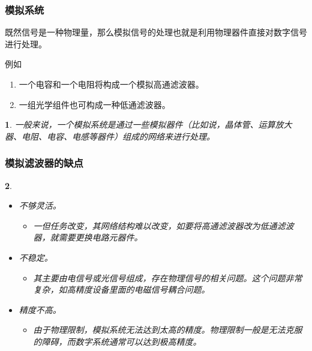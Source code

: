 \documentclass[notheorems,compress,mathserif,table]{beamer}
\newtheorem{dablock}{}
\begin{document}
\begin{frame}\frametitle{模拟系统}%


    既然信号是一种物理量，那么模拟信号的处理也就是利用物理器件直接对数字信号进行处理。

例如
\begin{enumerate}
    \item 一个电容和一个电阻将构成一个模拟高通滤波器。
    \item 一组光学组件也可构成一种低通滤波器。
\end{enumerate}
\begin{dablock}
    一般来说，一个模拟系统是通过一些模拟器件（比如说，晶体管、运算放大器、电阻、电容、电感等器件）组成的网络来进行处理。
\end{dablock}
\end{frame}
%
%
%
%
%
%
\begin{frame}\frametitle{模拟滤波器的缺点}%

\begin{dablock}
    \begin{itemize}
      \item [(1)] 不够灵活。
            \begin{itemize}
              \item 一但任务改变，其网络结构难以改变，如要将高通滤波器改为低通滤波器，就需要更换电路元器件。
            \end{itemize}
      \item [(2)]  不稳定。
            \begin{itemize}
              \item 其主要由电信号或光信号组成，存在物理信号的相关问题。这个问题非常复杂，如高精度设备里面的电磁信号耦合问题。
            \end{itemize}
      \item [(3)]  精度不高。
            \begin{itemize}
              \item 由于物理限制，模拟系统无法达到太高的精度。物理限制一般是无法克服的障碍，而数字系统通常可以达到极高精度。
            \end{itemize}
    \end{itemize}
\end{dablock}
\end{frame}
\end{document}
